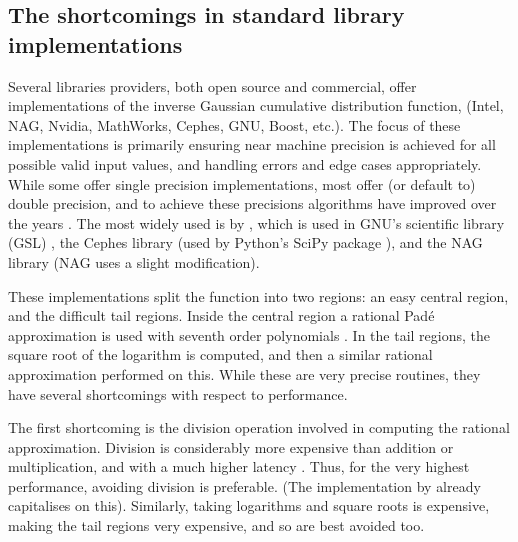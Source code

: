 \documentclass[9pt,a4paper,english]{extarticle}
\begin{document}
\subsection{The shortcomings in standard library implementations}

Several libraries providers, both open source and commercial, offer implementations of the inverse Gaussian cumulative distribution function, (Intel, NAG, Nvidia, MathWorks, Cephes, GNU, Boost, etc.). The focus of these implementations is primarily ensuring near machine precision is achieved for all possible valid input values, and handling errors and edge cases appropriately. While some offer single precision implementations, most offer (or default to) double precision, and to achieve these precisions algorithms have improved over the years \citep{hastings1955approximations,evans1974algorithm70,beasley1985percentage,wichura1988algorithm,marsaglia1994rapid,giles2011approximating}. The most widely used is by \citet{wichura1988algorithm}, which is used in GNU's scientific library (GSL) \citep{galassi2017gsl}, the Cephes library \citep{moshier1992cephes} (used by Python's SciPy package \citep{scipy2020scipy}), and the NAG library \citep{nag2017mark26} (NAG uses a slight modification). 

These implementations split the function into two regions: an easy central region, and the difficult tail regions. Inside the central region a rational Pad\'{e} approximation is used with seventh order polynomials \citep{wichura1988algorithm}. In the tail regions, the square root of the logarithm is computed, and then a similar rational approximation performed on this. While these are very precise routines, they have several shortcomings with respect to performance.

The first shortcoming is the division operation involved in computing the rational approximation. Division is considerably more expensive than addition or multiplication, and with a much higher latency \citep{wittmann2015short,fog2018instruction}. Thus, for the very highest performance, avoiding division is preferable. (The implementation by \citet{giles2011approximating} already capitalises on this). Similarly, taking logarithms and square roots is expensive, making the tail regions very expensive, and so are best avoided too. 
\end{document}
